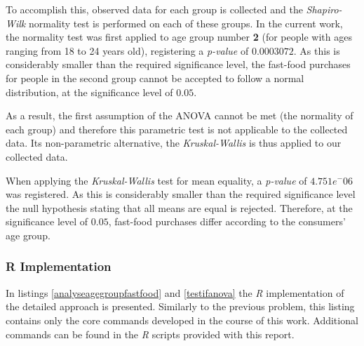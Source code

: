 \documentclass[12pt]{article}
\begin{document}
To accomplish this, observed data for each group is collected and the \emph{Shapiro-Wilk} normality test is performed on each of these groups. In the current work, the normality test was first applied to age group number \textbf{2} (for people with ages ranging from 18 to 24 years old), registering a \emph{p-value} of $0.0003072$. As this is considerably smaller than the required significance level, the fast-food purchases for people in the second group cannot be accepted to follow a normal distribution, at the significance level of $0.05$.

As a result, the first assumption of the ANOVA cannot be met (the normality of each group) and therefore this parametric test is not applicable to the collected data. Its non-parametric alternative, the \emph{Kruskal-Wallis} is thus applied to our collected data.

When applying the \emph{Kruskal-Wallis} test for mean equality, a \emph{p-value} of $4.751e^-{06}$ was registered. As this is considerably smaller than the required significance level the null hypothesis stating that all means are equal is rejected. Therefore, at the significance level of $0.05$, fast-food purchases differ according to the consumers' age group.

\subsubsection{R Implementation}

In listings \ref{analyseagegroupfastfood} and \ref{testifanova} the \emph{R} implementation of the detailed approach is presented. Similarly to the previous problem, this listing contains only the core commands developed in the course of this work. Additional commands can be found in the \emph{R} scripts provided with this report.
\end{document}

